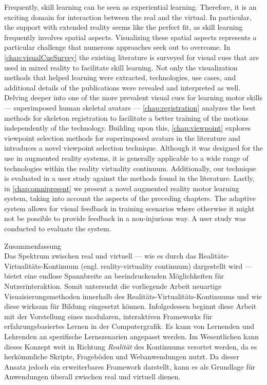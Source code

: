 Frequently, skill learning can be seen as experiential learning. Therefore, it is an exciting domain for interaction between the real and the virtual. In particular, the support with extended reality seems like the perfect fit, as skill learning frequently involves spatial aspects. Visualizing these spatial aspects represents a particular challenge that numerous approaches seek out to overcome. In \autoref{chap:visualCueSurvey} the existing literature is surveyed for visual cues that are used in mixed reality to facilitate skill learning. Not only the visualization methods that helped learning were extracted, technologies, use cases, and additional details of the publications were revealed and interpreted as well.
Delving deeper into one of the more prevalent visual cues for learning motor skills --- superimposed human skeletal avatars --- \autoref{chap:registration} analyzes the best methods for skeleton registration to facilitate a better training of the motions independently of the technology.
Building upon this, \autoref{chap:viewpoint} explores viewpoint selection methods for superimposed avatars in the literature and introduces a novel viewpoint selection technique. Although it was designed for the use in augmented reality systems, it is generally applicable to a wide range of technologies within the reality virtuality continuum. Additionally, our technique is evaluated in a user study against the methods found in the literature.
Lastly, in \autoref{chap:omnipresent} we present a novel augmented reality motor learning system, taking into account the aspects of the preceding chapters. The adaptive system allows for visual feedback in training scenarios where otherwise it might not be possible to provide feedback in a non-injurious way. A user study was conducted to evaluate the system.


\vspace*{20mm}

{Zusammenfassung}\label{sec:abstract-diff} \\

Das Spektrum zwischen real und virtuell --- wie es durch das Realitäts-Virtualitäts-Kontinuum (engl. reality-virtuality continuum) dargestellt wird --- bietet eine endlose Spannbreite an beeindruckenden Möglichkeiten für Nutzerinteraktion. Somit untersucht die vorliegende Arbeit neuartige Visuaisierungsmethoden innerhalb des Realitäts-Virtualitäts-Kontinuums und wie diese wirksam für Bildung eingesetzt können. Infolgedessen beginnt diese Arbeit mit der Vorstellung eines modularen, interaktiven Frameworks für erfahrungsbasiertes Lernen in der Computergrafik. Es kann von Lernenden und Lehrenden an spezifische Lernszenarien angepasst werden. Im Wesentlichen kann dieses Konzept weit in Richtung \emph{Realität} des Kontinuums verortet werden, da es herkömmliche Skripte, Frageböden und Webanwendungen nutzt. Da dieser Ansatz jedoch ein erweiterbares Framework darstellt, kann es als Grundlage für Anwendungen überall zwischen real und virtuell dienen.


